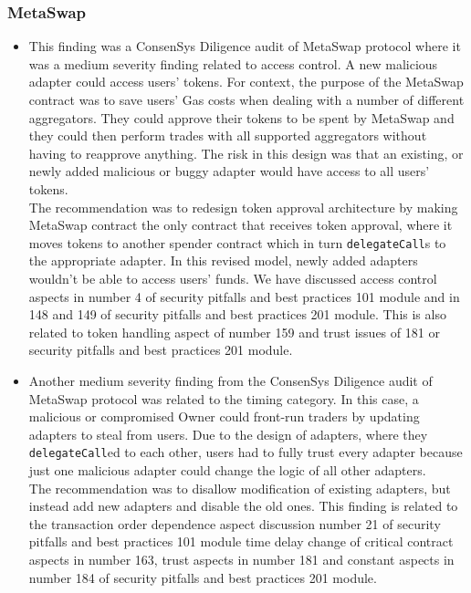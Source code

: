 \subsubsection{MetaSwap}\label{metaswap}

\begin{itemize}
\item
  This finding was a ConsenSys Diligence audit of MetaSwap protocol
  where it was a medium severity finding related to access control. A
  new malicious adapter could access users' tokens. For context, the
  purpose of the MetaSwap contract was to save users' Gas costs when
  dealing with a number of different aggregators. They could approve
  their tokens to be spent by MetaSwap and they could then perform
  trades with all supported aggregators without having to reapprove
  anything. The risk in this design was that an existing, or newly added
  malicious or buggy adapter would have access to all users' tokens.\\

  The recommendation was to redesign token approval architecture by
  making MetaSwap contract the only contract that receives token
  approval, where it moves tokens to another spender contract which in
  turn \texttt{delegateCall}s to the appropriate adapter. In this
  revised model, newly added adapters wouldn't be able to access users'
  funds. We have discussed access control aspects in number 4 of
  security pitfalls and best practices 101 module and in 148 and 149 of
  security pitfalls and best practices 201 module. This is also related
  to token handling aspect of number 159 and trust issues of 181 or
  security pitfalls and best practices 201 module.
\item
  Another medium severity finding from the ConsenSys Diligence audit of
  MetaSwap protocol was related to the timing category. In this case, a
  malicious or compromised Owner could front-run traders by updating
  adapters to steal from users. Due to the design of adapters, where
  they \texttt{delegateCall}ed to each other, users had to fully trust
  every adapter because just one malicious adapter could change the
  logic of all other adapters.\\

  The recommendation was to disallow modification of existing adapters,
  but instead add new adapters and disable the old ones. This finding is
  related to the transaction order dependence aspect discussion number
  21 of security pitfalls and best practices 101 module time delay
  change of critical contract aspects in number 163, trust aspects in
  number 181 and constant aspects in number 184 of security pitfalls and
  best practices 201 module.
\end{itemize}

